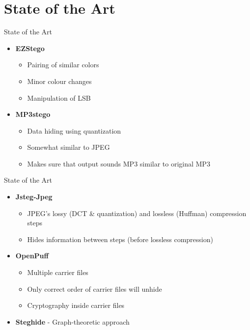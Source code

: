 \section{State of the Art} 
\begin{frame}{State of the Art}{} 
	\begin{itemize} 
		\item \textbf{EZStego} 
			\begin{itemize} 
				\item Pairing of similar colors 
				\item Minor colour changes 
				\item Manipulation of LSB
			\end{itemize}
			
		\item \textbf{MP3stego}
			\begin{itemize}
				\item Data hiding using quantization
				\item Somewhat similar to JPEG
				\item Makes sure that output sounds MP3 similar to original MP3
			\end{itemize}
	\end{itemize}
\end{frame}

\begin{frame}{State of the Art}{}
	\begin{itemize}
		\item \textbf{Jsteg-Jpeg}
			\begin{itemize}
				\item JPEG's lossy (DCT \& quantization) and lossless (Huffman) compression steps
				\item Hides information between steps (before lossless compression)
			\end{itemize}
			
		\item \textbf{OpenPuff}
			\begin{itemize}
				\item Multiple carrier files
				\item Only correct order of carrier files will unhide
				\item Cryptography inside carrier files
			\end{itemize}
		\item \textbf{Steghide} - Graph-theoretic approach 
	\end{itemize} 
\end{frame} 

